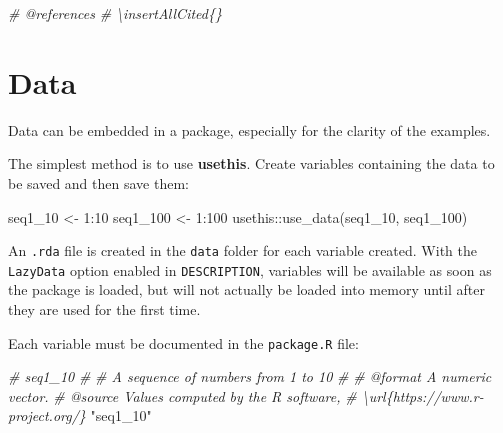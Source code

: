\documentclass[
  12pt,
  american,
  a4paper,
  extrafontsizes,onecolumn,openright
  ]{memoir}
\newenvironment{Shaded}{\begin{snugshade}}{\end{snugshade}}
\newcommand{\CommentTok}[1]{\textcolor[rgb]{0.56,0.35,0.01}{\textit{#1}}}
\newcommand{\DecValTok}[1]{\textcolor[rgb]{0.00,0.00,0.81}{#1}}
\newcommand{\FunctionTok}[1]{\textcolor[rgb]{0.00,0.00,0.00}{#1}}
\newcommand{\NormalTok}[1]{#1}
\newcommand{\OtherTok}[1]{\textcolor[rgb]{0.56,0.35,0.01}{#1}}
\newcommand{\SpecialCharTok}[1]{\textcolor[rgb]{0.00,0.00,0.00}{#1}}
\newcommand{\StringTok}[1]{\textcolor[rgb]{0.31,0.60,0.02}{#1}}
\begin{document}
\scriptsize

\begin{Shaded}
\begin{Highlighting}[]
\CommentTok{\#\textquotesingle{} @references}
\CommentTok{\#\textquotesingle{} \textbackslash{}insertAllCited\{\}}
\end{Highlighting}
\end{Shaded}

\normalsize

\hypertarget{data}{%
\section{Data}\label{data}}

Data can be embedded in a package, especially for the clarity of the examples.

The simplest method is to use \textbf{usethis}.
Create variables containing the data to be saved and then save them:

\scriptsize

\begin{Shaded}
\begin{Highlighting}[]
\NormalTok{seq1\_10 }\OtherTok{\textless{}{-}} \DecValTok{1}\SpecialCharTok{:}\DecValTok{10}
\NormalTok{seq1\_100 }\OtherTok{\textless{}{-}} \DecValTok{1}\SpecialCharTok{:}\DecValTok{100}
\NormalTok{usethis}\SpecialCharTok{::}\FunctionTok{use\_data}\NormalTok{(seq1\_10, seq1\_100)}
\end{Highlighting}
\end{Shaded}

\normalsize

An \texttt{.rda} file is created in the \texttt{data} folder for each variable created.
With the \texttt{LazyData} option enabled in \texttt{DESCRIPTION}, variables will be available as soon as the package is loaded, but will not actually be loaded into memory until after they are used for the first time.

Each variable must be documented in the \texttt{package.R} file:

\scriptsize

\begin{Shaded}
\begin{Highlighting}[]
\CommentTok{\#\textquotesingle{} seq1\_10}
\CommentTok{\#\textquotesingle{}}
\CommentTok{\#\textquotesingle{} A sequence of numbers from 1 to 10}
\CommentTok{\#\textquotesingle{}}
\CommentTok{\#\textquotesingle{} @format A numeric vector.}
\CommentTok{\#\textquotesingle{} @source Values computed by the R software, }
\CommentTok{\#\textquotesingle{}   \textbackslash{}url\{https://www.r{-}project.org/\}}
\StringTok{"seq1\_10"}
\end{Highlighting}
\end{Shaded}
\end{document}
